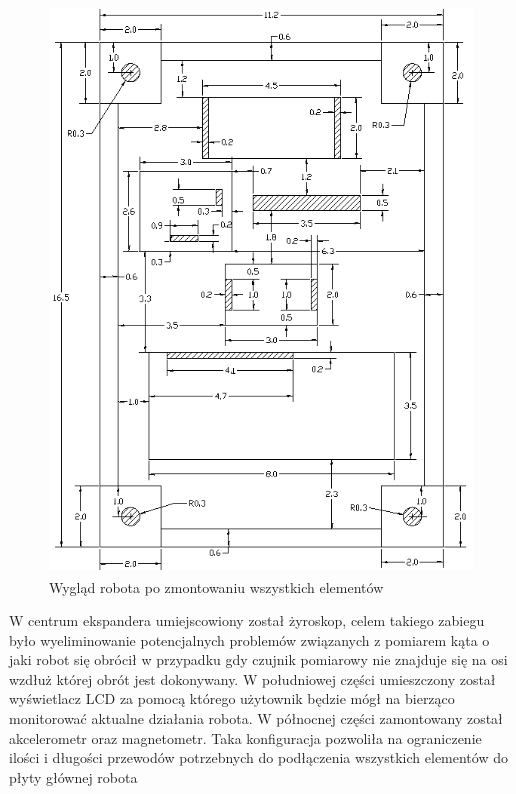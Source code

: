 \begin{figure}[h!]
 \centering
 \includegraphics[height=150mm]{../images/ch04/sensor_board.png}
 \caption{Wygląd robota po zmontowaniu wszystkich elementów}
 \label{fig:SensorsBoard}
\end{figure}

W centrum ekspandera umiejscowiony został żyroskop, celem takiego zabiegu było
wyeliminowanie potencjalnych problemów związanych z pomiarem kąta o jaki robot
się obrócił w przypadku gdy czujnik pomiarowy nie znajduje się na osi wzdłuż
której obrót jest dokonywany. W południowej części umieszczony został
wyświetlacz LCD za pomocą którego użytownik będzie mógł na bierząco monitorować
aktualne działania robota. W północnej części zamontowany został akcelerometr
oraz magnetometr. Taka konfiguracja pozwoliła na ograniczenie ilości i długości
przewodów potrzebnych do podłączenia wszystkich elementów do płyty głównej
robota
